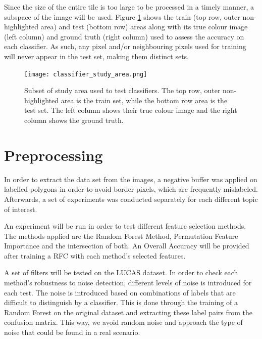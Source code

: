 \documentclass[12pt, english, openany]{book}
\begin{document}
Since the size of the entire tile is too large to be processed in a timely
manner, a subspace of the image will be used. Figure
\ref{fig:classifier-study-area} shows the train (top row, outer non-highlighted
area) and test (bottom row) areas along with its true colour image (left column)
and ground truth (right column) used to assess the accuracy on each classifier.
As such, any pixel and/or neighbouring pixels used for training will never
appear in the test set, making them distinct sets.

\begin{figure}[H]
	\centering
	\texttt{[image: classifier\_study\_area.png]}
  \caption[Subset of study area used to test classifiers.]{Subset of study area
  used to test classifiers. The top row, outer non-highlighted area is the train
  set, while the bottom row area is the test set. The left column shows their
  true colour image and the right column shows the ground truth.}
  \label{fig:classifier-study-area}
\end{figure}

\section{Preprocessing}

In order to extract the data set from the images, a negative buffer was applied
on labelled polygons in order to avoid border pixels, which are frequently
mislabeled. Afterwards, a set of experiments was conducted separately for each
different topic of interest.

An experiment will be run in order to test different feature selection
methods. The methods applied are the Random Forest Method, Permutation Feature
Importance and the intersection of both. An Overall Accuracy will be provided
after training a RFC with each method's selected features.

A set of filters will be tested on the LUCAS dataset. In order to check each
method's robustness to noise detection, different levels of noise is introduced
for each test. The noise is introduced based on combinations of labels that are
difficult to distinguish by a classifier. This is done through the training of
a Random Forest on the original dataset and extracting these label pairs from
the confusion matrix. This way, we avoid random noise and approach the type of
noise that could be found in a real scenario.
\end{document}
